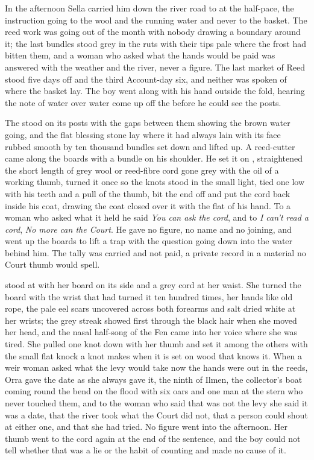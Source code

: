 \scenebreak

In the afternoon Sella carried him down the river road to  at the half-pace, the instruction going to the wool and the running water and never to the basket. The reed work was going out of the month with nobody drawing a boundary around it; the last bundles stood grey in the ruts with their tips pale where the frost had bitten them, and a woman who asked what the hands would be paid was answered with the weather and the river, never a figure. The last market of Reed stood five days off and the third Account-day six, and neither was spoken of where the basket lay. The boy went along with his hand outside the fold, hearing the note of water over water come up off the  before he could see the posts.

The  stood on its posts with the gaps between them showing the brown water going, and the flat blessing stone lay where it had always lain with its face rubbed smooth by ten thousand bundles set down and lifted up. A reed-cutter came along the boards with a bundle on his shoulder. He set it on , straightened the short length of grey wool or reed-fibre cord gone grey with the oil of a working thumb, turned it once so the knots stood in the small light, tied one low with his teeth and a pull of the thumb, bit the end off and put the cord back inside his coat, drawing the coat closed over it with the flat of his hand. To a woman who asked what it held he said \emph{You can ask the cord}, and to \emph{I can't read a cord}, \emph{No more can the Court}. He gave no figure, no name and no joining, and went up the boards to lift a trap with the question going down into the water behind him. The tally was carried and not paid, a private record in a material no Court thumb would spell.

 stood at  with her board on its side and a grey cord at her waist. She turned the board with the wrist that had turned it ten hundred times, her hands like old rope, the pale eel scars uncovered across both forearms and salt dried white at her wrists; the grey streak showed first through the black hair when she moved her head, and the nasal half-song of the Fen came into her voice where she was tired. She pulled one knot down with her thumb and set it among the others with the small flat knock a knot makes when it is set on wood that knows it. When a weir woman asked what the levy would take now the hands were out in the reeds, Orra gave the date as she always gave it, the ninth of Ilmen, the collector's boat coming round the bend on the flood with six oars and one man at the stern who never touched them, and to the woman who said that was not the levy she said it was a date, that the river took what the Court did not, that a person could shout at either one, and that she had tried. No figure went into the afternoon. Her thumb went to the cord again at the end of the sentence, and the boy could not tell whether that was a lie or the habit of counting and made no cause of it.

